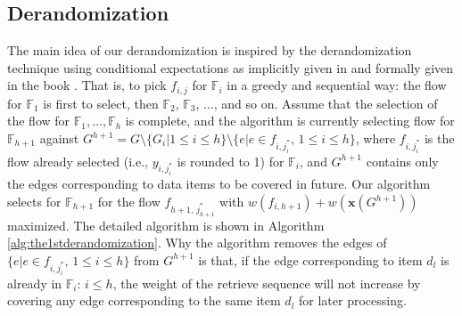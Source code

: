 \documentclass[11pt,english,onecolumn,draftcls]{IEEEtran}
\theoremstyle{plain}
\theoremstyle{plain}
\theoremstyle{plain}
\theoremstyle{plain}
\begin{document}
\subsection{Derandomization}

The main idea of our derandomization is inspired by the derandomization
technique using conditional expectations as implicitly given in \cite{erdos1973combinatorial}
and formally given in the book \cite{spencer1987ten}. That is, to
pick $f_{i,j}$ for $\mathbb{F}_{i}$ in a greedy and sequential way:
the flow for $\mathbb{F}_{1}$ is first to select, then $\mathbb{F}_{2}$,
$\mathbb{F}_{3}$, $\dots$, and so on. Assume that the selection
of the flow for $\mathbb{F}_{1},\dots,\mathbb{F}_{h}$ is complete,
and the algorithm is currently selecting flow for $\mathbb{F}_{h+1}$
against $G^{h+1}=G\setminus\{G_{i}\vert1\leq i\leq h\}\setminus\{e\vert e\in f_{i,j_{i}^{*}},\,1\leq i\leq h\}$,
where $f_{i,j_{i}^{*}}$ is the flow already selected (i.e., $y_{i,j_{i}^{*}}$
is rounded to 1) for $\mathbb{F}_{i}$, and $G^{h+1}$ contains only
the edges corresponding to data items to be covered in future. Our
algorithm selects for $\mathbb{F}_{h+1}$ for the flow $f_{h+1,\, j_{h+1}^{*}}$
with $w(f_{i,h+1})+w(\mathbf{x}(G^{h+1}))$ maximized. The detailed
algorithm is shown in Algorithm \ref{alg:the1stderandomization}.
Why the algorithm removes the edges of $\{e\vert e\in f_{i,j_{i}^{*}},\,1\leq i\leq h\}$
from $G^{h+1}$ is that, if the edge corresponding to item $d_{l}$
is already in $\mathbb{F}_{i}:\, i\leq h$, the weight of the retrieve
sequence will not increase by covering any edge corresponding to the
same item $d_{l}$ for later processing.
\end{document}
